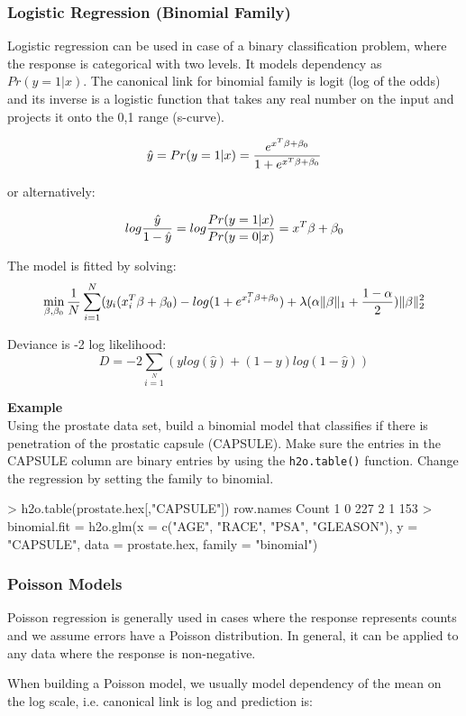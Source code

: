 \documentclass[11pt]{article}
\begin{document}
\subsubsection{Logistic Regression (Binomial Family)}
Logistic regression can be used in case of a binary classification problem, where the response is categorical with two levels. It models dependency as $Pr(y = 1|x)$. The canonical link for binomial family is logit (log of the odds) and its inverse is a logistic function that takes any real number on the input and projects it onto the 0,1 range (s-curve). 

\[ \hat{y} = Pr(y = 1|x) = {e^{x^T\beta + \beta_0} \over 1 + e^{x^T \beta + \beta_0} } \]

or alternatively:


\[log {\hat{y} \over 1- \hat{y}} = log{Pr(y=1|x) \over Pr(y=0|x)} = x^T \beta + \beta_0\]

The model is fitted by solving:
\[  \min\limits_{\beta,\beta_0} { {1 \over N}\sum\limits_{i=1}\limits^{N}(y_i (x_i^{T}\beta  + \beta_0) - log (1 + e^{x_i^{T}\beta  + \beta_0} )  + \lambda (\alpha \|\beta \|_1 + {1-\alpha \over 2}) \| \beta \|_2^2} \]

Deviance is -2 log likelihood:
\[D = -2\sum\limits_{i=1}\limits^{N}{(y log(\hat{y}) + (1 - y)log(1-\hat{y})  )}\]

\textbf{Example}\\
Using the prostate data set, build a binomial model that classifies if there is penetration of the prostatic capsule (CAPSULE). Make sure the entries in the CAPSULE column are binary entries by using the \texttt{h2o.table()} function. Change the regression by setting the family to binomial.
\begin{spverbatim}
> h2o.table(prostate.hex[,"CAPSULE"])
  row.names Count
1         0   227
2         1   153
> binomial.fit = h2o.glm(x = c("AGE", "RACE", "PSA", "GLEASON"), y = "CAPSULE", data = prostate.hex, family = "binomial")
\end{spverbatim}

\subsubsection{Poisson Models}
Poisson regression is generally used in cases where the response represents counts and we assume errors have a Poisson distribution. In general, it can be applied to any data where the response is non-negative. 

When building a Poisson model, we usually model dependency of the mean on the log scale, i.e. canonical link is log and prediction is:
\end{document}
